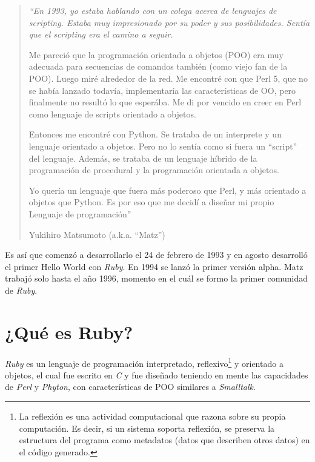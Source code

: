 \documentclass{article}
\begin{document}
\begin{quotation}
\em``En 1993, yo estaba hablando con un colega acerca de lenguajes de scripting. Estaba muy impresionado por su poder y sus posibilidades. Sentía que el scripting era el camino a seguir.
	\par
	Me pareció que la programación orientada a objetos (POO) era muy adecuada para secuencias de comandos también (como viejo fan de la POO). Luego miré alrededor de la red. Me encontré con que Perl 5, que no se había lanzado todavía, implementaría las características de OO, pero  finalmente no resultó lo que esperába. Me di por vencido en creer en Perl como lenguaje de scripts orientado a objetos.
	\par
	Entonces me encontré con Python. Se trataba de un interprete y un lenguaje orientado a objetos. Pero no lo sentía como si fuera un ``script'' del lenguaje. Además, se trataba de un lenguaje híbrido de la programación de procedural y la programación orientada a objetos.
	\par
	Yo quería un lenguaje que fuera más poderoso que Perl, y más orientado a objetos que Python. Es por eso que me decidí a diseñar mi propio Lenguaje de programación''
\begin{flushright} Yukihiro Matsumoto (a.k.a. “Matz”)\end{flushright}
\end{quotation}  

Es así que comenzó a desarrollarlo el 24 de febrero de 1993 y en agosto desarrolló el primer Hello World con \textit{Ruby}. En 1994 se lanzó la primer versión alpha. Matz trabajó solo hasta el año 1996, momento en el cuál se formo la primer comunidad de \textit{Ruby}.
\bigskip




\section{¿Qué es Ruby?}

	\textit{Ruby} es un lenguaje de programación interpretado, reflexivo\footnote{La reflexión es una actividad computacional que razona sobre su propia computación. Es decir, si un sistema soporta reflexión, se preserva la estructura del programa como metadatos (datos que describen otros datos) en el código generado.} y orientado a objetos, el cual fue escrito en \textit{C} y fue diseñado teniendo en mente las capacidades de \textit{Perl} y \textit{Phyton}, con características de POO similares a \textit{Smalltalk}.
\bigskip
\end{document}
